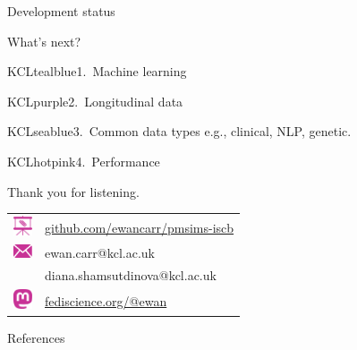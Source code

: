 \documentclass[11pt]{beamer}
\begin{document}
\begin{frame}[t]{Development status}

\end{frame}

\begin{frame}[t]{What's next?}
\begin{cbox}{KCLtealblue}{1.\ Machine learning}{}

\end{cbox}

\begin{cbox}{KCLpurple}{2.\ Longitudinal data}{}

\end{cbox}

\begin{cbox}{KCLseablue}{3.\ Common data types}{}
    e.g., clinical, NLP, genetic.

\end{cbox}

\begin{cbox}{KCLhotpink}{4.\ Performance}{}

\end{cbox}

\end{frame}

\begin{frame}[c]
	\centering
	Thank you for listening.\\[3em]
    \begin{tabular}{cl}
        \includegraphics[width=1.5em,valign=c]{figures/slides.pdf} & \textcolor{KCLhotpink}{\href{https://github.com/ewancarr/pmsims-iscb}{github.com/ewancarr/pmsims-iscb}} \\[1.7em] 
        \includegraphics[width=1.5em,valign=c]{figures/email.pdf} & \textcolor{KCLhotpink}{ewan.carr@kcl.ac.uk} \\[.4em] 
        & \textcolor{KCLhotpink}{diana.shamsutdinova@kcl.ac.uk}\\[1.7em] 
        \includegraphics[width=1.5em,valign=c]{figures/mastodon.pdf} & \href{https://fediscience.org/@ewan}{\textcolor{KCLhotpink}{fediscience.org/@ewan}} 
    \end{tabular}
\end{frame}

\appendix

\begin{frame}[allowframebreaks]{References}
	\renewcommand*{\bibfont}{\scriptsize}
	\printbibliography
\end{frame}
\end{document}
